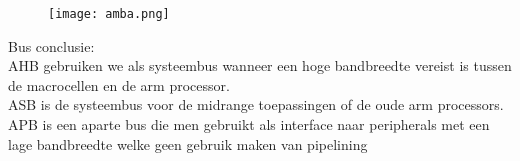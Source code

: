 \begin{figure}[H]
    \centering
    \texttt{[image: amba.png]}
    \end{figure}

\vspace{1cm}

Bus conclusie:\\
AHB gebruiken we als systeembus wanneer een hoge bandbreedte vereist is tussen de macrocellen en de arm processor.\\
ASB is de systeembus voor de midrange toepassingen of de oude arm processors.\\
APB is een aparte bus die men gebruikt als interface naar peripherals met een lage bandbreedte welke geen gebruik maken van pipelining



